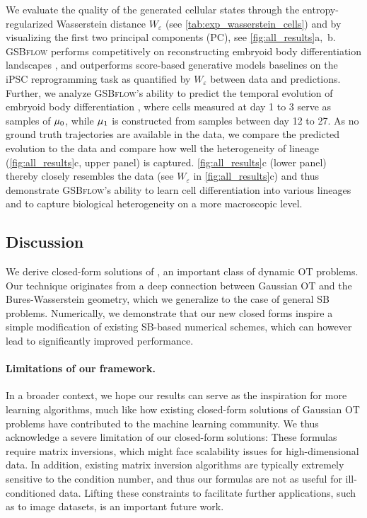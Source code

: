  We evaluate the quality of the generated cellular states through the entropy-regularized Wasserstein distance $W_\varepsilon$
(see \cref{tab:exp_wasserstein_cells}) and by visualizing the first two principal components (PC), see \cref{fig:all_results}a,~b.
\textsc{GSBflow} performs competitively on reconstructing embryoid body differentiation landscapes \citep{moon2019visualizing}, and outperforms score-based generative models baselines on the \acrfull{iPSC} reprogramming task \citep{schiebinger2019optimal} as quantified by $W_\varepsilon$ between data and predictions.
Further, we analyze \textsc{GSBflow}'s ability to predict the temporal evolution of embryoid body differentiation \citep{moon2019visualizing}, where cells measured at day 1 to 3 serve as samples of $\mu_0$, while $\mu_1$ is constructed from samples between day 12 to 27. As no ground truth trajectories are available in the data, we compare the predicted evolution to the data and compare how well the heterogeneity of lineage (\cref{fig:all_results}c, upper panel) is captured.
\cref{fig:all_results}c (lower panel) thereby closely resembles the data (see $W_\varepsilon$ in \cref{fig:all_results}c) and thus demonstrate \textsc{GSBflow}'s ability to learn cell differentiation into various lineages and to capture biological heterogeneity on a more macroscopic level.

\subsection{Discussion}
 We derive closed-form solutions of , an important class of dynamic \acrshort{OT} problems. Our technique originates from a deep connection between Gaussian \acrshort{OT} and the Bures-Wasserstein geometry, which we generalize to the case of general \acrshort{SB} problems. Numerically, we demonstrate that our new closed forms inspire a simple modification of existing \acrshort{SB}-based numerical schemes, which can however lead to significantly improved performance.

\paragraph{Limitations of our framework.}
 In a broader context, we hope our results can serve as the inspiration for more learning algorithms, much like how existing closed-form solutions of Gaussian \acrshort{OT} problems have contributed to the machine learning community. We thus acknowledge a severe limitation of our closed-form solutions: These formulas require matrix inversions, which might face scalability issues for high-dimensional data. In addition, existing matrix inversion algorithms are typically extremely sensitive to the condition number, and thus our formulas are not as useful for ill-conditioned data. Lifting these constraints to facilitate further applications, such as to image datasets, is an important future work.
